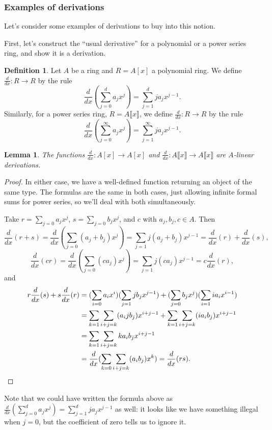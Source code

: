\documentclass{amsart}[12pt]
\numberwithin{equation}{section}
\theoremstyle{plain} %
\newtheorem{lem}[equation]{Lemma}
\theoremstyle{definition}
\newtheorem{defn}[equation]{Definition}
\theoremstyle{remark}
\newcommand{\sssec}[1]{\subsubsection{#1}}
\begin{document}
\sssec{Examples of derivations}

Let's consider some examples of derivations to buy into this notion. 


First, let's construct the ``usual derivative'' for a polynomial or a power series ring, and show it is a derivation.

\begin{defn}
Let $A$ be a ring and $R=A[x]$ a polynomial ring. We define $\frac{d}{dx}:R\to R$ by the rule
\[ \frac{d}{dx} ( \sum_{j=0}^d a_j x^j) = \sum_{j=1}^d j a_j x^{j-1}.\]
Similarly, for a power series ring, $R= A\llbracket x\rrbracket$, we define
$\frac{d}{dx}:R\to R$ by the rule
\[ \frac{d}{dx} ( \sum_{j=0}^\infty a_j x^j) = \sum_{j=1}^\infty j a_j x^{j-1}.\]
\end{defn}


\begin{lem}
The functions $\frac{d}{dx}: A[x] \to A[x]$ and $\frac{d}{dx}: A\llbracket x\rrbracket \to  A\llbracket x\rrbracket$ are $A$-linear derivations.
\end{lem}
\begin{proof}
In either case, we have a well-defined function returning an object of the same type. The formulas are the same in both cases, just allowing infinite formal sums for power series, so we'll deal with both simultaneously. 

Take $r= \sum_{j=0} a_j x^j$, $s= \sum_{j=0} b_j x^j$, and $c$ with $a_j,b_j,c\in A$. Then
\[ \frac{d}{dx} (r+s) = \frac{d}{dx}  (\sum_{j=0} (a_j+b_j) x^j ) = \sum_{j=1} j (a_j+b_j) x^{j-1} = \frac{d}{dx}(r) + \frac{d}{dx}(s),\]
\[ \frac{d}{dx} (cr) = \frac{d}{dx}  (\sum_{j=0} (ca_j) x^j ) = \sum_{j=1} j (ca_j) x^{j-1} = c \frac{d}{dx}(r) ,\]
and
\[\begin{aligned}
 r\frac{d}{dx}(s) + s \frac{d}{dx}(r) &= (\sum_{i=0} a_i x^i )( \sum_{j=1} j b_j x^{j-1}) + (\sum_{j=0} b_j x^j )( \sum_{i=1} i a_i x^{i-1}) 
 \\ &= \sum_{k=1} \sum_{i+j=k} (a_i j b_j) x^{i+j-1} + \sum_{k=1} \sum_{i+j=k} (i a_i b_j) x^{i+j-1} 
 \\&= \sum_{k=1} \sum_{i+j=k} k a_i b_j x^{i+j-1} 
 \\&= \frac{d}{dx}  (\sum_{k=0} \sum_{i+j=k} (a_ib_j) x^k ) = \frac{d}{dx} (rs). \qedhere
\end{aligned}\]
 \end{proof}
 

Note that we could have written the formula above as $\frac{d}{dx} ( \sum_{j=0}^d a_j x^j) = \sum_{j=1}^d j a_j x^{j-1}$ as well: it looks like we have something illegal when $j=0$, but the coefficient of zero tells us to ignore it.
\end{document}
